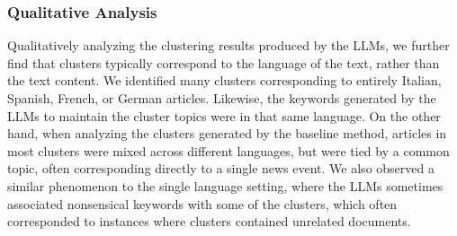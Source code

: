 \subsubsection{Qualitative Analysis}

Qualitatively analyzing the clustering results produced by the LLMs, we further find that clusters typically correspond to the language of the text, rather than the text content.
We identified many clusters corresponding to entirely Italian, Spanish, French, or German articles.
Likewise, the keywords generated by the LLMs to maintain the cluster topics were in that same language.
On the other hand, when analyzing the clusters generated by the baseline method, articles in most clusters were mixed across different languages, but were tied by a common topic, often corresponding directly to a single news event.
We also observed a similar phenomenon to the single language setting, where the LLMs sometimes associated nonsensical keywords with some of the clusters, which often corresponded to instances where clusters contained unrelated documents.






